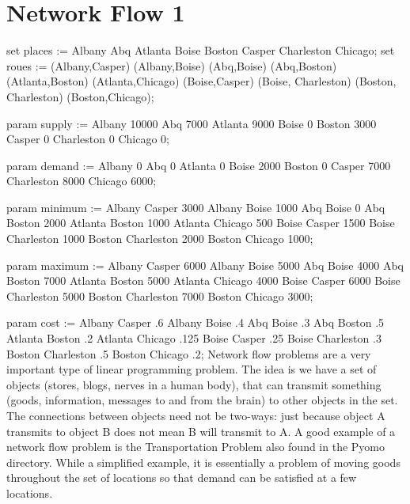 \documentclass{article}
\begin{document}
\section*{Network Flow 1}

set places := Albany Abq Atlanta Boise Boston Casper Charleston 
              Chicago;
set roues := (Albany,Casper) (Albany,Boise) (Abq,Boise) 
             (Abq,Boston) (Atlanta,Boston) (Atlanta,Chicago) 
             (Boise,Casper) (Boise, Charleston) 
             (Boston, Charleston) (Boston,Chicago);
             
param supply :=
Albany 10000
Abq 7000
Atlanta 9000
Boise 0
Boston 3000
Casper 0
Charleston 0
Chicago 0;

param demand :=
Albany 0
Abq 0
Atlanta 0
Boise 2000
Boston 0
Casper 7000
Charleston 8000
Chicago 6000;

param minimum :=
Albany Casper 3000
Albany Boise 1000
Abq Boise 0
Abq Boston 2000
Atlanta Boston 1000
Atlanta Chicago 500
Boise Casper 1500
Boise Charleston 1000
Boston Charleston 2000
Boston Chicago 1000;

param maximum :=
Albany Casper 6000
Albany Boise 5000
Abq Boise 4000
Abq Boston 7000
Atlanta Boston 5000
Atlanta Chicago 4000
Boise Casper 6000
Boise Charleston 5000
Boston Charleston 7000
Boston Chicago 3000;

param cost :=
Albany Casper .6
Albany Boise .4
Abq Boise .3
Abq Boston .5
Atlanta Boston .2
Atlanta Chicago .125
Boise Casper .25
Boise Charleston .3
Boston Charleston .5
Boston Chicago .2;
Network flow problems are a very important type of linear programming problem.  The idea is we have a set of objects (stores, blogs, nerves in a human body), that can transmit something (goods, information, messages to and from the brain) to other objects in the set.  The connections between objects need not be two-ways: just because object A transmits to object B does not mean B will transmit to A.  A good example of a network flow problem is the Transportation Problem also found in the Pyomo directory.  While a simplified example, it is essentially a problem of moving goods throughout the set of locations so that demand can be satisfied at a few locations.
\end{document}
